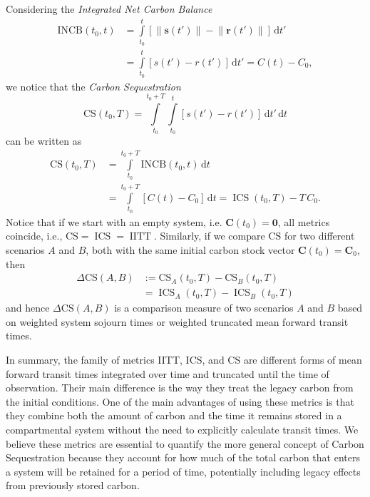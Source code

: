 \documentclass[ProofPDF]{./Styles/Jnls-Template-V3}
\newcommand{\CS}{\mathrm{CS}}
\newcommand{\INCB}{\mathrm{INCB}}
\newcommand{\IITT}{\operatorname{IITT}}
\newcommand{\ICS}{\operatorname{ICS}}
\newcommand{\intl}{\int\limits}
\newcommand{\dd}[1]{\,\mathrm{d}#1}
\renewcommand{\vec}[1]{\mathbf{#1}}
\newcommand{\vnorm}[1]{\left\|#1\right\|}
\begin{document}
Considering the {\it Integrated Net Carbon Balance}
\begin{equation}
    \begin{aligned}
        \INCB(t_0,t) &= \intl_{t_0}^{t}\left[\vnorm{\vec{s}(t')}-\vnorm{\vec{r}(t')}\right]\dd{t'} \\
        &= \intl_{t_0}^t \left[s(t')-r(t')\right]\dd{t'} = C(t)-C_0,
    \end{aligned}
\end{equation}
we notice that the {\it Carbon Sequestration}
\begin{equation}
    \CS(t_0,T) = \intl_{t_0}^{t_0+T} \intl_{t_0}^t \left[s(t')-r(t')\right]\dd{t'}\dd{t}
\end{equation}
can be written as
\begin{equation}
    \begin{aligned}
        \CS(t_0,T)& = \intl_{t_0}^{t_0+T} \INCB(t_0,t)\dd{t}\\ 
        &= \intl_{t_0}^{t_0+T} \left[C(t) - C_0\right]\dd{t} = \ICS(t_0,T) - T\,C_0.
     \end{aligned}
\end{equation}
Notice that if we start with an empty system, i.e. $\vec{C}(t_0) = \vec{0}$, all metrics coincide, i.e.,  $\CS = \ICS = \IITT$. 
Similarly, if we compare $\CS$ for two different scenarios $A$ and $B$, both with the same initial carbon stock vector $\vec{C}(t_0)=\vec{C}_0$, then
\begin{equation}
    \label{eqn:Delta_CS}
    \begin{aligned}
        \Delta\CS(A,B)& := \CS_A(t_0,T) - \CS_B(t_0,T)\\ 
        &= \ICS_A(t_0,T) - \ICS_B(t_0,T)
    \end{aligned}
\end{equation}
and hence $\Delta\CS(A,B)$ is a comparison measure of two scenarios $A$ and $B$ based on weighted system sojourn times or weighted truncated mean forward transit times.

In summary, the family of metrics IITT, ICS, and CS are different forms of mean forward transit times integrated over time and truncated until the time of observation. Their main difference is the way they treat the legacy carbon from the initial conditions. One of the main advantages of using these metrics is that they combine both the amount of carbon and the time it remains stored in a compartmental system without the need to explicitly calculate transit times. We believe these metrics are essential to quantify the more general concept of Carbon Sequestration because they account for how much of the total carbon that enters a system will be retained for a period of time, potentially including legacy effects from previously stored carbon. 
\end{document}
